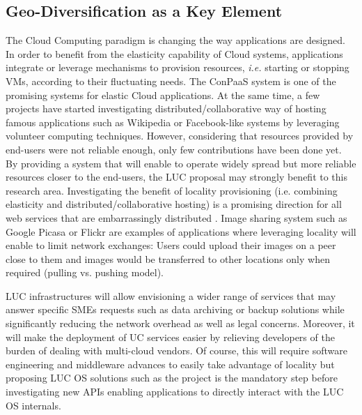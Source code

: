 \subsection{Geo-Diversification as a Key Element}
The Cloud Computing paradigm is changing the way applications are designed.  In
order to benefit from the elasticity capability of Cloud systems, applications
integrate or leverage mechanisms to provision resources, \textit{i.e.} starting or
stopping VMs, according to their fluctuating needs.
The ConPaaS system \cite{pierre:2012} is one of the promising systems for elastic Cloud
applications. At the same time, a few projects have started investigating
distributed/collaborative way of hosting famous applications such as Wikipedia
or Facebook-like  systems by leveraging volunteer computing techniques. 
However, considering that resources provided by end-users were not reliable enough, only few contributions 
have been done yet. 
%
By providing a system that will enable to operate widely spread but more
reliable resources closer to the end-users, the LUC proposal may strongly
benefit to this research area.
Investigating the benefit of locality provisioning (i.e. combining elasticity and distributed/collaborative
hosting) is a promising direction for all web services that are embarrassingly distributed
\cite{church:2008}.  Image sharing system such as Google Picasa  or Flickr  are
examples of applications where leveraging locality will enable to limit network exchanges:
Users could upload their images on a peer close to them and images would be
transferred to other locations only when required (pulling vs. pushing
model).

LUC infrastructures will allow envisioning a wider range of services that may
answer specific SMEs requests such as data archiving or backup solutions while
significantly reducing the network overhead as well as legal concerns. Moreover, 
it will make the deployment of UC services easier by relieving developers of the burden of dealing with
multi-cloud vendors.
Of course, this will require software engineering and
middleware advances to easily take advantage of locality but proposing LUC OS
solutions such as the  \discovery project is the mandatory step before
investigating new APIs enabling applications to directly interact with the LUC OS internals. 
%
%
